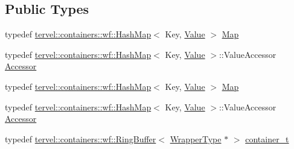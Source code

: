 \subsection*{Public Types}
\begin{DoxyCompactItemize}
\item 
typedef \hyperlink{classtervel_1_1containers_1_1wf_1_1_hash_map}{tervel\+::containers\+::wf\+::\+Hash\+Map}$<$ Key, \hyperlink{hash__map_2test_object_8h_ad777bf08d8e2b01df17ba5e3c51ae11f}{Value} $>$ \hyperlink{class_test_class_a1b85c62e95a514dec1b9680e76348329}{Map}
\item 
typedef \hyperlink{classtervel_1_1containers_1_1wf_1_1_hash_map}{tervel\+::containers\+::wf\+::\+Hash\+Map}$<$ Key, \hyperlink{hash__map_2test_object_8h_ad777bf08d8e2b01df17ba5e3c51ae11f}{Value} $>$\+::Value\+Accessor \hyperlink{class_test_class_a0af9e93839a0717ed717ab4818353762}{Accessor}
\item 
typedef \hyperlink{classtervel_1_1containers_1_1wf_1_1_hash_map}{tervel\+::containers\+::wf\+::\+Hash\+Map}$<$ Key, \hyperlink{hash__map_2test_object_8h_ad777bf08d8e2b01df17ba5e3c51ae11f}{Value} $>$ \hyperlink{class_test_class_a1b85c62e95a514dec1b9680e76348329}{Map}
\item 
typedef \hyperlink{classtervel_1_1containers_1_1wf_1_1_hash_map}{tervel\+::containers\+::wf\+::\+Hash\+Map}$<$ Key, \hyperlink{hash__map_2test_object_8h_ad777bf08d8e2b01df17ba5e3c51ae11f}{Value} $>$\+::Value\+Accessor \hyperlink{class_test_class_a0af9e93839a0717ed717ab4818353762}{Accessor}
\item 
typedef \hyperlink{classtervel_1_1containers_1_1wf_1_1_ring_buffer}{tervel\+::containers\+::wf\+::\+Ring\+Buffer}$<$ \hyperlink{class_test_class_1_1_wrapper_type}{Wrapper\+Type} $\ast$ $>$ \hyperlink{class_test_class_abe640a96ccd2edb9a09ad292c8a8b298}{container\+\_\+t}
\end{DoxyCompactItemize}
